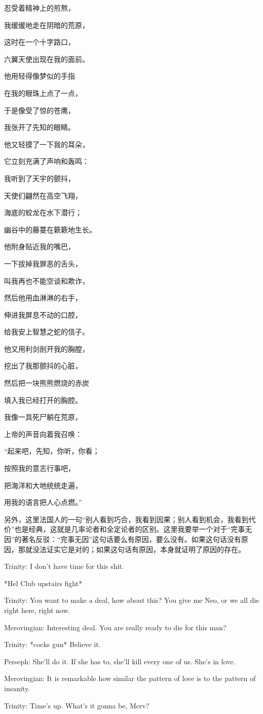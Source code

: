 \documentclass[UTF8]{ctexart}
\newenvironment{myquote}{\color{green} \setlength{\leftskip}{6em} \setlength{\rightskip}{4em} \setlength{\parindent}{-2em}}{\par}
\begin{document}
{\centering \it

忍受着精神上的煎熬，

我缓缓地走在阴暗的荒原，

这时在一个十字路口，

六翼天使出现在我的面前。

他用轻得像梦似的手指

在我的眼珠上点了一点，

于是像受了惊的苍鹰，

我张开了先知的眼睛。

他又轻摸了一下我的耳朵，

它立刻充满了声响和轰鸣：

我听到了天宇的颤抖，

天使们翩然在高空飞翔，

海底的蛟龙在水下潜行；

幽谷中的藤蔓在簌簌地生长。

他附身贴近我的嘴巴，

一下拔掉我罪恶的舌头，

叫我再也不能空谈和欺诈，

然后他用血淋淋的右手，

伸进我屏息不动的口腔，

给我安上智慧之蛇的信子。

他又用利剑剖开我的胸膛，

挖出了我那颤抖的心脏，

然后把一块熊熊燃烧的赤炭

填入我已经打开的胸腔。

我像一具死尸躺在荒原，

上帝的声音向着我召唤：

“起来吧，先知，你听，你看；

按照我的意志行事吧，

把海洋和大地统统走遍，

用我的语言把人心点燃。”

}

另外，这里法国人的一句“别人看到巧合，我看到因果；别人看到机会，我看到代价”也是经典，这就是几率论者和全定论者的区别。这里我要举一个对于“完事无因”的著名反驳：“完事无因”这句话要么有原因，要么没有。如果这句话没有原因，那就没法证实它是对的；如果这句话有原因，本身就证明了原因的存在。

\begin{myquote}
Trinity: I don't have time for this shit.

*Hel Club upstairs fight*

Trinity: You want to make a deal, how about this? You give me Neo, or we all die right here, right now.

Merovingian: Interesting deal. You are really ready to die for this man?

Trinity: *cocks gun* Believe it.

Perseph: She'll do it. If she has to, she'll kill every one of us. She's in love.

Merovingian: It is remarkable how similar the pattern of love is to the pattern of insanity.

Trinity: Time's up. What's it gonna be, Merv?
\end{myquote}
\end{document}
